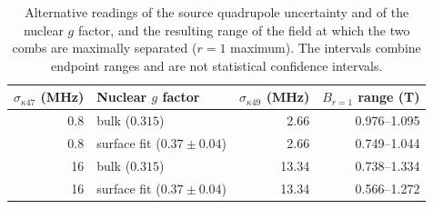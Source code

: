 \begin{table}[htbp]
\centering
\small
\setlength{\tabcolsep}{4pt}
\caption{Alternative readings of the source quadrupole uncertainty and of the nuclear $g$ factor, and the resulting range of the field at which the two combs are maximally separated ($r=1$ maximum). The intervals combine endpoint ranges and are not statistical confidence intervals.}\label{tab:unc}
\begin{tabular}{rlrr}
\toprule
$\sigma_{\kappa47}$ (MHz) & Nuclear $g$ factor & $\sigma_{\kappa49}$ (MHz) & $B_{r=1}$ range (T) \\
\midrule
0.8 & bulk ($0.315$) & 2.66 & 0.976--1.095 \\
0.8 & surface fit ($0.37\pm0.04$) & 2.66 & 0.749--1.044 \\
16 & bulk ($0.315$) & 13.34 & 0.738--1.334 \\
16 & surface fit ($0.37\pm0.04$) & 13.34 & 0.566--1.272 \\
\bottomrule
\end{tabular}
\end{table}
